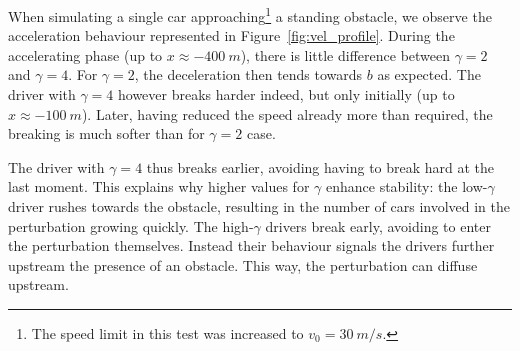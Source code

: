 When simulating a single car approaching\footnote{The speed limit in this test was increased to $v_0 = \SI{30}{m/s}$.} a standing obstacle, we observe the acceleration behaviour represented in Figure~\ref{fig:vel_profile}. During the accelerating phase (up to $x\approx\SI{-400}{m}$), there is little difference between $\gamma=2$ and $\gamma=4$. For $\gamma = 2$, the deceleration then tends towards $b$ as expected. The driver with $\gamma=4$ however breaks harder indeed, but only initially (up to $x\approx \SI{-100}{m}$). Later, having reduced the speed already more than required, the breaking is much softer than for $\gamma=2$ case.

The driver with $\gamma=4$ thus breaks earlier, avoiding having to break hard at the last moment. This explains why higher values for $\gamma$ enhance stability: the low-$\gamma$ driver rushes towards the obstacle, resulting in the number of cars involved in the perturbation growing quickly. The high-$\gamma$ drivers break early, avoiding to enter the perturbation themselves. Instead their behaviour signals the drivers further upstream the presence of an obstacle. This way, the perturbation can diffuse upstream.

